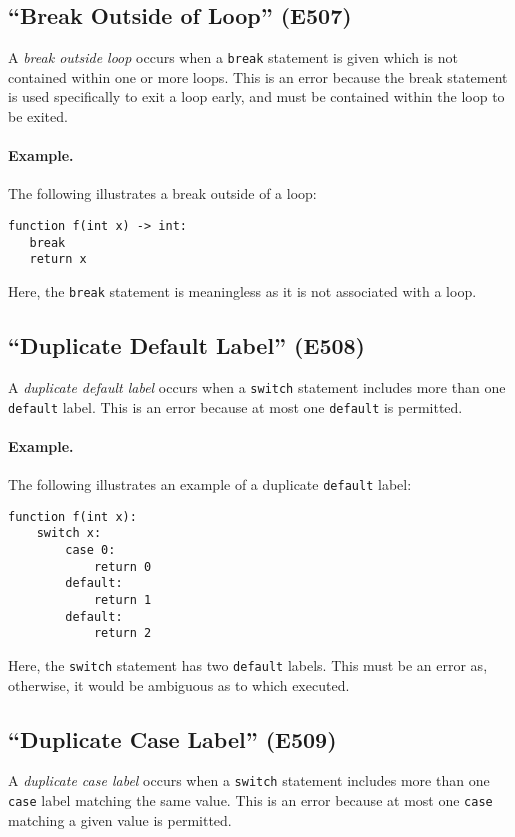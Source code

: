 \subsection{``Break Outside of Loop'' (E507)}

A {\em break outside loop} occurs when a \lstinline{break} statement is given which is not contained within one or more loops.  This is an error because the break statement is used specifically to exit a loop early, and must be contained within the loop to be exited.  

\paragraph{Example.}  The following illustrates a break outside of a loop:

\begin{lstlisting}
function f(int x) -> int:
   break
   return x
\end{lstlisting}

Here, the \lstinline{break} statement is meaningless as it is not associated with a loop.

\subsection{``Duplicate Default Label'' (E508)}
A {\em duplicate default label} occurs when a \lstinline{switch} statement includes more than one \lstinline{default} label.  This is an error because at most one \lstinline{default} is permitted.

\paragraph{Example.}  The following illustrates an example of a duplicate \lstinline{default} label:

\begin{lstlisting}
function f(int x):
    switch x:
        case 0:
            return 0
        default:
            return 1
        default:
            return 2
\end{lstlisting}

Here, the \lstinline{switch} statement has two \lstinline{default} labels.  This must be an error as, otherwise, it would be ambiguous as to which executed.

\subsection{``Duplicate Case Label'' (E509)}
A {\em duplicate case label} occurs when a \lstinline{switch} statement includes more than one \lstinline{case} label matching the same value.  This is an error because at most one \lstinline{case} matching a given value is permitted.


